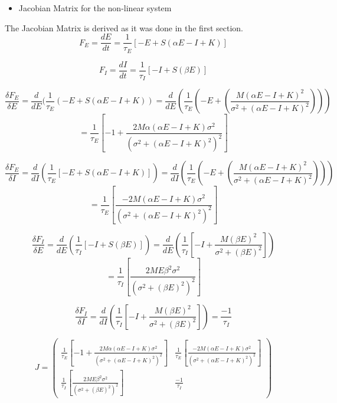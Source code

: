 \documentclass{article}
\begin{document}
\begin{itemize}
 \item Jacobian Matrix  for the non-linear system
\end{itemize}
The Jacobian Matrix is derived as it was done in the first section. 
\begin{equation*}
 F_E=\frac{dE}{dt}=\frac{1}{\tau_E}[-E+S(\alpha E-I+K)] 
\end{equation*}

\begin{equation*}
 F_I=\frac{dI}{dt}=\frac{1}{\tau_I}[-I+S(\beta E)]
\end{equation*}

\begin{equation*}
\frac{\delta F_E}{\delta E}=\frac{d}{dE}(\frac{1}{\tau_E}(-E+S(\alpha E-I+K))=\frac{d}{dE}(\frac{1}{\tau_E}(-E+(\frac{M(\alpha E-I+K)^2}{\sigma^2 + (\alpha E-I+K)^2})))
\end{equation*}
\begin{equation*}
 =\frac{1}{\tau_E}[-1+\frac{2M\alpha (\alpha E -I+K)\sigma^2}{(\sigma^2+(\alpha E -I+K)^2)^2}]
\end{equation*}

\begin{equation*}
 \frac{\delta F_E}{\delta I}=\frac{d}{dI}(\frac{1}{\tau_E}[-E+S(\alpha E-I+K)])=\frac{d}{dI}(\frac{1}{\tau_E}(-E+(\frac{M(\alpha E-I+K)^2}{\sigma^2 + (\alpha E-I+K)^2})))
\end{equation*}
 \begin{equation*}
  =\frac{1}{\tau_E}[\frac{-2M(\alpha E-I+K)\sigma^2}{(\sigma^2 + (\alpha E-I+K)^2)^2}]
 \end{equation*}


\begin{equation*}
 \frac{\delta F_I}{\delta E}=\frac{d}{dE}(\frac{1}{\tau_I}[-I+S(\beta E)])=\frac{d}{dE}(\frac{1}{\tau_I}[-I+\frac{M(\beta E)^2}{\sigma^2 + (\beta E)^2}])
\end{equation*}
\begin{equation*}
 =\frac{1}{\tau_I}[\frac{2ME\beta^2 \sigma^2}{(\sigma^2 + (\beta E)^2)^2}]
\end{equation*}



\begin{equation*}
 \frac{\delta F_I}{\delta I}=\frac{d}{dI}(\frac{1}{\tau_I}[-I+\frac{M(\beta E)^2}{\sigma^2 + (\beta E)^2}])=\frac{-1}{\tau_I}
\end{equation*}


\textbf{}
\begin{large}\[
 J=
\left ( \begin{array}{cc}
\frac{1}{\tau_E}[-1+\frac{2M\alpha (\alpha E -I+K)\sigma^2}{(\sigma^2+(\alpha E -I+K)^2)^2}] & \frac{1}{\tau_E}[\frac{-2M(\alpha E-I+K)\sigma^2}{(\sigma^2 + (\alpha E-I+K)^2)^2}] \\
\frac{1}{\tau_I}[\frac{2ME\beta^2 \sigma^2}{(\sigma^2 + (\beta E)^2)^2}] & \frac{-1}{\tau_I} 
\end{array} \right )
\]\end{large}
\end{document}
